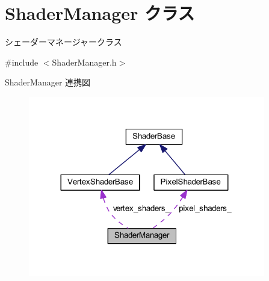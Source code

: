 \hypertarget{class_shader_manager}{}\section{Shader\+Manager クラス}
\label{class_shader_manager}


シェーダーマネージャークラス  




{\ttfamily \#include $<$Shader\+Manager.\+h$>$}



Shader\+Manager 連携図\nopagebreak
\begin{figure}[H]
\begin{center}
\leavevmode
\includegraphics[width=293pt]{class_shader_manager__coll__graph}
\end{center}
\end{figure}
